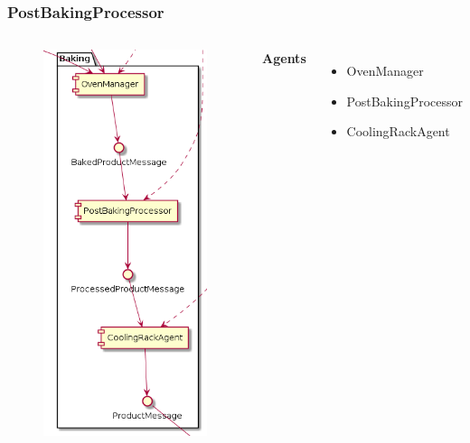 \documentclass{beamer}
\begin{document}
\begin{frame}
    \frametitle{\huge{PostBakingProcessor}}
    \begin{columns}[t]
        \begin{figure}[H]
            \centering
            \includegraphics[width=0.6\linewidth]{baking_component_diagram.png}
        \end{figure}
            \textbf{Agents}
            \begin{itemize}
                \item OvenManager
                \item PostBakingProcessor
                \item CoolingRackAgent
            \end{itemize}
    \end{columns}
\end{frame}
\end{document}

